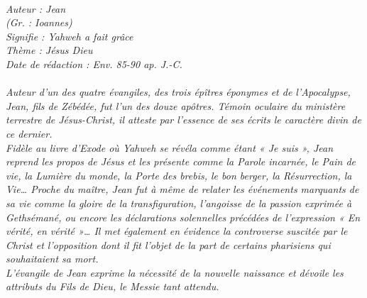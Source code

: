 \BFont
\noindent\hrulefill
{\footnotesize
\textit{
\bigskip
{\centering{}
\\Auteur : Jean
\\(Gr. : Ioannes)
\\Signifie : Yahweh a fait grâce
\\Thème : Jésus Dieu
\\Date de rédaction : Env. 85-90 ap. J.-C.\\}
}
\textit{
\\Auteur d'un des quatre évangiles, des trois épîtres éponymes et de l'Apocalypse, Jean, fils de Zébédée, fut l'un des douze apôtres. Témoin oculaire du ministère terrestre de Jésus-Christ, il atteste par l'essence de ses écrits le caractère divin de ce dernier.
\\Fidèle au livre d'Exode où Yahweh se révéla comme étant « Je suis », Jean reprend les propos de Jésus et les présente comme la Parole incarnée, le Pain de vie, la Lumière du monde, la Porte des brebis, le bon berger, la Résurrection, la Vie… Proche du maître, Jean fut à même de relater les événements marquants de sa vie comme la gloire de la transfiguration, l'angoisse de la passion exprimée à Gethsémané, ou encore les déclarations solennelles précédées de l'expression « En vérité, en vérité »… Il met également en évidence la controverse suscitée par le Christ et l'opposition dont il fit l'objet de la part de certains pharisiens qui souhaitaient sa mort.
\\L'évangile de Jean exprime la nécessité de la nouvelle naissance et dévoile les attributs du Fils de Dieu, le Messie tant
attendu.\bigskip
}
}
\par\nobreak\noindent\hrulefill
